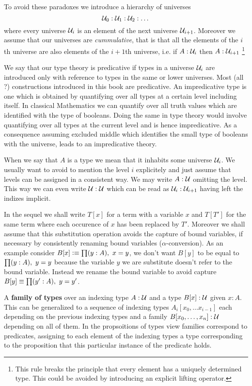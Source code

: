 To avoid these paradoxes we introduce a hierarchy of universes
\[ \mathcal{U}_0 : \mathcal{U}_1 : \mathcal{U}_2 : \dots \]
where every universe $\mathcal{U}_i$ is an element of the next universe
$\mathcal{U}_{i+1}$. Moreover we assume that our universes are
\emph{cummulative}, that is that all the elements of the $i$th
universe are also elements of the $i+1$th universe, i.e. if
$A:\mathcal{U}_i$ then $A:\mathcal{U}_{i+1}$
\footnote{This rule breaks the principle that every element
  has a uniquely determined type. This could be avoided by introducing
  an explicit lifting operator.}

We say that our type theory is predicative if types in a universe
$\mathcal{U}_i$ are introduced only with reference to types in the same or
lower universes. Most (all ?) constructions introduced in this book
are predicative. An impredicative type is one which is obtained by
quantifying over all types at a certain level including itself. In
classical Mathematics we can quantify over all truth values which are
identified with the type of booleans. Doing the same in type theory
would involve quantifying over all types at the current level and is
hence impredicative. As a consequence assuming excluded middle which
identifies the small type of booleans with the universe, leads to an
impredicative theory.

When we say that $A$ is a type we mean that it inhabits some universe
$\mathcal{U}_i$. We usually want to avoid to mention the level $i$ explicitely
and just assume that levels can be assigned in a consistent way. We
may write $A:\mathcal{U}$ omitting the level. This way we can even write
$\mathcal{U}:\mathcal{U}$ which can be read as $\mathcal{U}_i:\mathcal{U}_{i+1}$ having left the
indizes implicit. 

In the sequel we shall write $T[x]$ for a term with a variable $x$ and
$T[T']$ for the same term where each occurence of $x$ has been
replaced by $T'$. Moreover we shall assume that this substitution
operation avoids the capture of bound variables, if necessary by
consistently renaming bound variables ($\alpha$-conversion).
As an example consider $B[x] \defeq \prd{y:A}x = y$, we don't want
$B[y]$ to be equal to $\prd{y:A}y = y$ because the variable $y$ we are
substitute doesn't refer to the bound variable. Instead we rename the
bound variable to avoid capture $B[y] \jdeq \prd{y':A}y = y'$.

A \textbf{family of types} over an indexing type $A:\mathcal{U}$ and a 
type $B[x] : \mathcal{U}$ given $x:A$. This can be generalized to a sequence of indexing
types $A_i[x_0,\dots x_{i-1}]$ each depending on the previous indexing
types and a family $B[x_0,\dots,x_n] : \mathcal{U}$ depending on all of them. In the
propsoitions of types view families correspond to predicates,
assigning to each element of the indexing types a type corresponding
to the proposition that this particular instance of the predicate holds.

